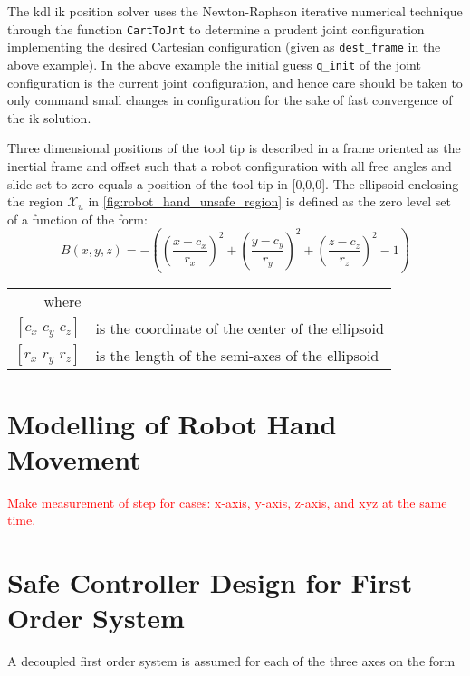 The \gls{kdl} \gls{ik} position solver uses the Newton-Raphson iterative numerical technique through the function \texttt{CartToJnt} to determine a prudent joint configuration implementing the desired Cartesian configuration (given as \texttt{dest\_frame} in the above example). In the above example the initial guess \texttt{q\_init} of the joint configuration is the current joint configuration, and hence care should be taken to only command small changes in configuration for the sake of fast convergence of the \gls{ik} solution.


Three dimensional positions of the tool tip is described in a frame oriented as the inertial frame and offset such that a robot configuration with all free angles and slide set to zero equals a position of the tool tip in [0,0,0].
The ellipsoid enclosing the region $\mathcal{X}_u$ in \autoref{fig:robot_hand_unsafe_region} is defined as the zero level set of a function of the form:
\begin{equation}
B(x,y,z) = -\left(  \left(\frac{x-c_x}{r_x}\right)^2 + \left(\frac{y-c_y}{r_y}\right)^2 + \left(\frac{z-c_z}{r_z}\right)^2 - 1 \right)
\end{equation}
\begin{tabular}{rl}
where&\\
$[c_x\,\, c_y\,\, c_z]$ & is the coordinate of the center of the ellipsoid\\
$[r_x\,\, r_y\,\, r_z]$ & is the length of the semi-axes of the ellipsoid\\
\end{tabular}


\section{Modelling of Robot Hand Movement}
\textcolor{red}{Make measurement of step for cases: x-axis, y-axis, z-axis, and xyz at the same time.}

\section{Safe Controller Design for First Order System}

A decoupled first order system is assumed for each of the three axes on the form

